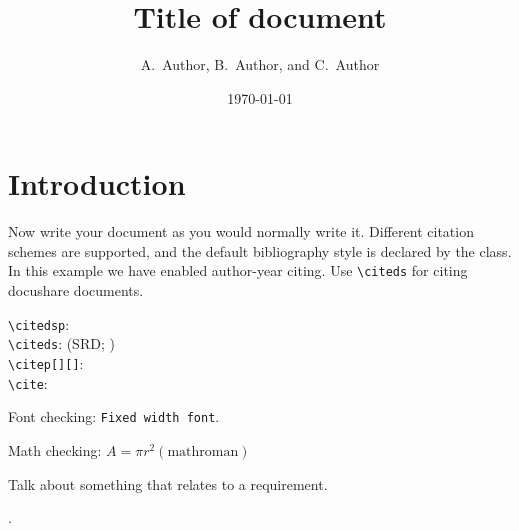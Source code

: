 \documentclass[DM,lsstdraft,authoryear,toc]{lsstdoc}
\title[Short title]{Title of document}
\author{
A.~Author,
B.~Author,
and
C.~Author}
\date{\today}
\begin{document}
\maketitle

\section{Introduction}

Now write your document as you would normally write it.
Different citation schemes are supported, and the default bibliography style is declared by the class.
In this example we have enabled author-year citing.
Use \verb|\citeds| for citing docushare documents.

\verb|\citedsp|:  \\
\verb|\citeds|: (SRD; ) \\
\verb|\citep[][]|: \citep[e.g.,][are interesting]{2009arXiv0912.0201L,2016SPIE.9913E..0GJ} \\
\verb|\cite|: \cite{LPM-51,Wang:2011:QDS:2063348.2063364}

Font checking: \texttt{Fixed width font}.

Math checking: $A = \pi r^2 \mathrm{(math roman)}$

Talk about something that relates to a requirement.

 .


\end{document}
